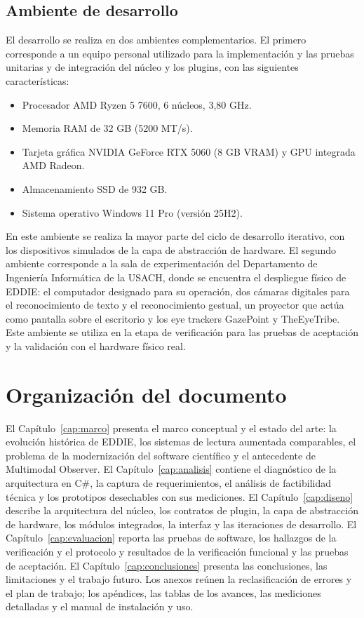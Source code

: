 \subsection{Ambiente de desarrollo}

El desarrollo se realiza en dos ambientes complementarios. El primero corresponde a un equipo personal utilizado para la implementación y las pruebas unitarias y de integración del núcleo y los plugins, con las siguientes características:

\begin{itemize}
  \item Procesador AMD Ryzen 5 7600, 6 núcleos, 3,80 GHz.
  \item Memoria RAM de 32 GB (5200 MT/s).
  \item Tarjeta gráfica NVIDIA GeForce RTX 5060 (8 GB VRAM) y GPU integrada AMD Radeon.
  \item Almacenamiento SSD de 932 GB.
  \item Sistema operativo Windows 11 Pro (versión 25H2).
\end{itemize}

En este ambiente se realiza la mayor parte del ciclo de desarrollo iterativo, con los dispositivos simulados de la capa de abstracción de hardware. El segundo ambiente corresponde a la sala de experimentación del Departamento de Ingeniería Informática de la USACH, donde se encuentra el despliegue físico de EDDIE: el computador designado para su operación, dos cámaras digitales para el reconocimiento de texto y el reconocimiento gestual, un proyector que actúa como pantalla sobre el escritorio y los eye trackers GazePoint y TheEyeTribe. Este ambiente se utiliza en la etapa de verificación para las pruebas de aceptación y la validación con el hardware físico real.

\section{Organización del documento}

El Capítulo~\ref{cap:marco} presenta el marco conceptual y el estado del arte: la evolución histórica de EDDIE, los sistemas de lectura aumentada comparables, el problema de la modernización del software científico y el antecedente de Multimodal Observer. El Capítulo~\ref{cap:analisis} contiene el diagnóstico de la arquitectura en C\#, la captura de requerimientos, el análisis de factibilidad técnica y los prototipos desechables con sus mediciones. El Capítulo~\ref{cap:diseno} describe la arquitectura del núcleo, los contratos de plugin, la capa de abstracción de hardware, los módulos integrados, la interfaz y las iteraciones de desarrollo. El Capítulo~\ref{cap:evaluacion} reporta las pruebas de software, los hallazgos de la verificación y el protocolo y resultados de la verificación funcional y las pruebas de aceptación. El Capítulo~\ref{cap:conclusiones} presenta las conclusiones, las limitaciones y el trabajo futuro. Los anexos reúnen la reclasificación de errores y el plan de trabajo; los apéndices, las tablas de los avances, las mediciones detalladas y el manual de instalación y uso.
